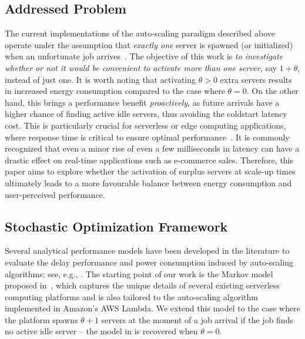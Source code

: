 \subsection{Addressed Problem}

The current implementations of the auto-scaling paradigm described above operate under the assumption that \emph{exactly one} server is spawned (or initialized)
when an unfortunate job arrives~\cite{scaleperrequest}.
The objective of this work is \emph{to investigate whether or not it would be convenient to activate more than one server}, say $1+\theta$, instead of just one.
It is worth noting that activating $\theta>0$ extra servers results in increased energy consumption compared to the case where $\theta=0$. On the other hand, this brings a performance benefit \emph{proactively}, as future arrivals have a higher chance of finding active idle servers, thus avoiding the coldstart latency cost.
%
This is particularly crucial for serverless or edge computing applications, where response time is critical to ensure optimal performance~\cite{DOGANI2024104837}. It is commonly recognized that even a minor rise of even a few milliseconds in latency can have a drastic effect on real-time applications such as e-commerce sales.
%
Therefore, this paper aims to explore whether the activation of surplus servers at scale-up times ultimately leads to a more favourable balance between energy consumption and user-perceived performance.


\subsection{Stochastic Optimization Framework}


Several analytical performance models have been developed in the literature to evaluate the delay performance and power consumption induced by auto-scaling algorithms; see, e.g., \cite{scaleperrequest,Jonckheere18,Gandhi13}. The starting point of our work is the Markov model proposed in~\cite{scaleperrequest}, which captures the unique details of several existing serverless computing platforms and is also tailored to the auto-scaling algorithm implemented in Amazon's AWS Lambda.
We extend this model to the case where the platform spawns $\theta+1$ servers at the moment of a job arrival if the job finds no active idle server -- the model in \cite{scaleperrequest} is recovered when $\theta=0$.

